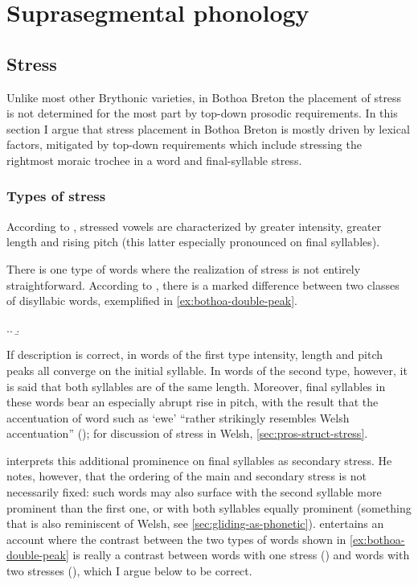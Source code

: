 \section{Suprasegmental phonology}
\label{sec:supr-phon}

\subsection{Stress}
\label{sec:stress}

Unlike most other Brythonic varieties, in Bothoa Breton the placement of stress is not determined for the most part by top-down prosodic requirements. In this section I argue that stress placement in Bothoa Breton is mostly driven by lexical factors, mitigated by top-down requirements which include stressing the rightmost moraic trochee in a word and final-syllable stress.

\subsubsection{Types of stress}
\label{sec:types-stress}

According to \citet{humphreys95:_phonol_bothoa_saint_nicol_pelem}, stressed vowels are characterized by greater intensity, greater length and rising pitch (this latter especially pronounced on final syllables).

There is one type of words where the realization of stress is not entirely straightforward. According to \citet{humphreys95:_phonol_bothoa_saint_nicol_pelem}, there is a marked difference between two classes of disyllabic words, exemplified in \ref{ex:bothoa-double-peak}.

\ex.\label{ex:bothoa-double-peak}\a.
\b.

If  description is correct, in words of the first type intensity, length and pitch peaks all converge on the initial syllable. In words of the second type, however, it is said that both syllables are of the same length. Moreover, final syllables in these words bear an especially abrupt rise in pitch, with the result that the accentuation of word such as \ipa{[ˈdaˌvad̥]} `ewe' \enquote{rather strikingly resembles Welsh accentuation} (); for discussion of stress in Welsh, \cf \cref{sec:pros-struct-stress}.

\citet{humphreys95:_phonol_bothoa_saint_nicol_pelem} interprets this additional prominence on final syllables as secondary stress. He notes, however, that the ordering of the main and secondary stress is not necessarily fixed:  such words may also surface with the second syllable more prominent than the first one, or with both syllables equally prominent (something that is also reminiscent of Welsh, see \cref{sec:gliding-as-phonetic}). \citet{humphreys95:_phonol_bothoa_saint_nicol_pelem} entertains an account where the contrast between the two types of words shown in \cref{ex:bothoa-double-peak} is really a contrast between words with one stress () and words with two stresses (), which I argue below to be correct.

